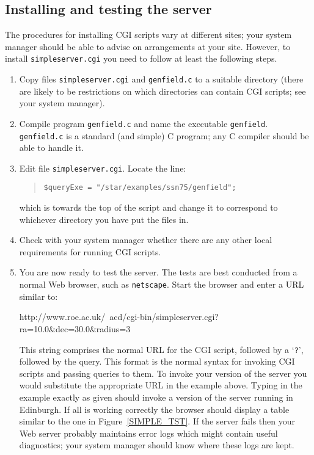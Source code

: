 \documentclass[twoside,11pt,nolof,chapters]{starlink}
\begin{document}
\subsection{Installing and testing the server}

The procedures for installing CGI scripts vary at different sites; your
system manager should be able to advise on arrangements at your site.
However, to install \texttt{simpleserver.cgi} you need to follow at least
the following steps.

\begin{enumerate}

  \item Copy files \texttt{simpleserver.cgi} and \texttt{genfield.c} to a
   suitable directory (there are likely to be restrictions on which
   directories can contain CGI scripts; see your system manager).

  \item Compile program \texttt{genfield.c} and name the executable \texttt{genfield}.  \texttt{genfield.c} is a standard (and simple) C program;
   any C compiler should be able to handle it.

  \item Edit file \texttt{simpleserver.cgi}.  Locate the line:

  \begin{quote}
   \verb-$queryExe = "/star/examples/ssn75/genfield";-
  \end{quote}

   which is towards the top of the script and change it to correspond
   to whichever directory you have put the files in.

  \item Check with your system manager whether there are any other
   local requirements for running CGI scripts.

  \item You are now ready to test the server.  The tests are best conducted
   from a normal Web browser, such as \texttt{netscape}.  Start the browser
   and enter a URL similar to:

  \begin{terminalv}
http://www.roe.ac.uk/~acd/cgi-bin/simpleserver.cgi?ra=10.0&dec=30.0&radius=3
  \end{terminalv}

   This string comprises the normal URL for the CGI script, followed
   by a `\texttt{?}', followed by the query.  This format is the normal
   syntax for invoking CGI scripts and passing queries to them.  To
   invoke your version of the server you would substitute the appropriate
   URL in the example above.  Typing in the example exactly as given
   should invoke a version of the server running in Edinburgh.  If
   all is working correctly the browser should display a table similar
   to the one in Figure~\ref{SIMPLE_TST}.  If the server fails then
   your Web server probably maintains error logs which might contain
   useful diagnostics; your system manager should know where these logs
   are kept.

\end{enumerate}
\end{document}
